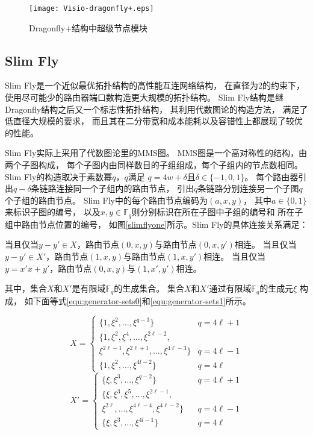 \begin{figure}[htp]
  \centering
    \texttt{[image: Visio-dragonfly+.eps]}
    \caption{Dragonfly+结构中超级节点模块}
    \label{dragonfly+}
\end{figure}

\subsection{Slim Fly}
Slim Fly是一个近似最优拓扑结构的高性能互连网络结构，
在直径为2的约束下，
使用尽可能少的路由器端口数构造更大规模的拓扑结构。
Slim Fly结构是继Dragonfly结构之后又一个标志性拓扑结构，
其利用代数图论的构造方法，
满足了低直径大规模的要求，
而且其在二分带宽和成本能耗以及容错性上都展现了较优的性能。

Slim Fly实际上采用了代数图论里的MMS图。
MMS图是一个高对称性的结构，由两个子图构成，
每个子图内由同样数目的子组组成，每个子组内的节点数相同。
Slim Fly的构造取决于素数幂$q$，$q$满足
$q=4w+\delta$且$\delta \in \{-1,0,1\}$。
每个路由器引出$q-\delta$条链路连接同一个子组内的路由节点，
引出$q$条链路分别连接另一个子图$q$个子组的路由节点。
Slim Fly中的每个路由节点编码为$(a,x,y)$，
其中$a\in \{0,1\}$来标识子图的编号，
以及$x,y\in\mathds{F}_q$则分别标识在所在子图中子组的编号和
所在子组中路由节点位置的编号，
如图\ref{slimflyone}所示。Slim Fly的具体连接关系满足：

当且仅当$y-y' \in X$，路由节点$(0,x,y)$与路由节点$(0,x,y')$相连。
当且仅当$y-y' \in X'$，路由节点$(1,x,y)$与路由节点$(1,x,y')$相连。
当且仅当$y=x'x+y'$，路由节点$(0,x,y)$与$(1,x',y')$相连。

其中，集合$X$和$X'$是有限域$\mathds{F}_q$的生成集合。
集合$X$和$X'$通过有限域$\mathds{F}_q$的生成元$\xi$ 构成，
如下面等式\ref{equ:generator-sets0}和\ref{equ:generator-sets1}所示。

\begin{equation}\label{equ:generator-sets0}
  X=
  \begin{cases}
    \{1,\xi^2,\ldots,\xi^{q-3}\}& q=4 \ell+1 \\
    \{1,\xi^2,\xi^4,\ldots, \xi^{2\ell-2},\\\xi^{2\ell-1},\xi^{2\ell+1},\ldots, \xi^{4\ell-3}\} & q=4 \ell-1 \\
    \{1,\xi^2,\ldots,\xi^{4l-2}\} & q=4 \ell
  \end{cases}
\end{equation}
\begin{equation}\label{equ:generator-sets1}
  X'=
  \begin{cases}
    \{\xi,\xi^3,\ldots,\xi^{q-2}\} & q=4 \ell+1 \\
    \{\xi,\xi^3,\xi^5,\ldots,\xi^{2\ell-1}, \\\xi^{2\ell},\ldots,\xi^{4\ell-4},\xi^{4\ell-2}\}\ \ \ \  & q=4 \ell-1 \\
    \{\xi,\xi^3,\ldots,\xi^{4l-1}\} & q=4 \ell
  \end{cases}
\end{equation}

